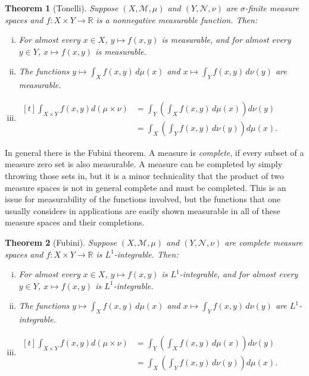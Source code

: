 \documentclass[12pt,openany]{book}
\newcommand{\R}{{\mathbb{R}}}
\newcommand{\sM}{{\mathscr{M}}}
\newcommand{\sN}{{\mathscr{N}}}
\theoremstyle{plain}
\newtheorem{thm}{Theorem}[section]
\theoremstyle{remark}
\theoremstyle{definition}
\theoremstyle{exercise}
\theoremstyle{example}
\begin{document}
\begin{thm}[Tonelli]
Suppose $(X,\sM,\mu)$ and $(Y,\sN,\nu)$ are $\sigma$-finite measure spaces
and $f \colon X \times Y \to \R$ is a nonnegative measurable function.
Then:
\begin{enumerate}[(i)]
\item For almost every $x \in X$, $y \mapsto f(x,y)$ is measurable, and
for almost every $y \in Y$, $x \mapsto f(x,y)$ is measurable.
\item The functions $y \mapsto \int_X f(x,y) \, d\mu(x)$ and $x \mapsto
\int_Y f(x,y) \, d\nu(y)$ are measurable.
\item
$
\begin{aligned}[t]
\int_{X \times Y} f(x,y) d(\mu\times \nu)
& =
\int_Y \left( \int_X f(x,y) \, d\mu(x) \right) d\nu(y)
\\
& =
\int_X \left( \int_Y f(x,y) \, d\nu(y) \right) d\mu(x) .
\end{aligned}
$
\end{enumerate}
\end{thm}

In general there is the Fubini theorem.  A measure is
\emph{complete}, if every subset of a measure zero
set is also measurable.  A measure can be completed by simply throwing
those sets in, but it is a minor technicality that the product of two
measure spaces is not in general complete and must be completed.  This is an
issue for measurability of the functions involved, but the functions that
one usually considers in applications are easily shown
measurable in all of these measure spaces and their completions.

\begin{thm}[Fubini]
Suppose $(X,\sM,\mu)$ and $(Y,\sN,\nu)$ are complete measure spaces
and $f \colon X \times Y \to \R$ is $L^1$-integrable.
Then:
\begin{enumerate}[(i)]
\item For almost every $x \in X$, $y \mapsto f(x,y)$ is $L^1$-integrable,
and for almost every $y \in Y$, $x \mapsto f(x,y)$ is $L^1$-integrable.
\item The functions $y \mapsto \int_X f(x,y) \, d\mu(x)$ and
$x \mapsto \int_Y f(x,y) \, d\nu(y)$ are $L^1$-integrable.
\item
$
\begin{aligned}[t]
\int_{X \times Y} f(x,y) d(\mu\times \nu)
& =
\int_Y \left( \int_X f(x,y) \, d\mu(x) \right) d\nu(y)
\\
& =
\int_X \left( \int_Y f(x,y) \, d\nu(y) \right) d\mu(x) .
\end{aligned}
$
\end{enumerate}
\end{thm}
\end{document}
